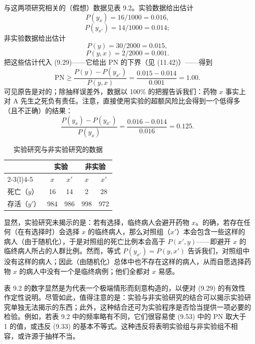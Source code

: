 与这两项研究相关的（假想）数据见表 9.2。实验数据给出估计
\begin{equation}
P(y_x)=16/1000=0.016, \tag{9.49}
\end{equation}
\begin{equation}
P(y_{x'})=14/1000=0.014; \tag{9.50}
\end{equation}
非实验数据给出估计
\begin{equation}
P(y)=30/2000=0.015, \tag{9.51}
\end{equation}
\begin{equation}
P(y,x)=2/2000=0.001. \tag{9.52}
\end{equation}
把这些估计代入 \textup{(9.29)}——它给出 PN 的下界（见 \textup{(11.42)}）——得到
\begin{equation}
\mathrm{PN}\ge\frac{P(y)-P(y_{x'})}{P(y,x)}=\frac{0.015-0.014}{0.001}=1.00. \tag{9.53}
\end{equation}
可见原告是对的；除抽样误差外，数据以 100\% 的把握告诉我们：药物 $x$ 事实上对 A 先生之死负有责任。注意，直接使用实验的超额风险比会得到一个低得多（且不正确）的结果：
\begin{equation}
\frac{P(y_x)-P(y_{x'})}{P(y_x)}=\frac{0.016-0.014}{0.016}=0.125. \tag{9.54}
\end{equation}

\begin{table}[htbp]
\centering
\caption{实验研究与非实验研究的数据}
\label{tab:9.2}
\small
\begin{tabular}{lcccc}
\toprule
& \multicolumn{2}{c}{实验} & \multicolumn{2}{c}{非实验}\\
\cmidrule(lr){2-3}\cmidrule(l){4-5}
& $x$ & $x'$ & $x$ & $x'$\\
\midrule
死亡（$y$）  & 16  & 14  & 2   & 28\\
存活（$y'$） & 984 & 986 & 998 & 972\\
\bottomrule
\end{tabular}
\end{table}

显然，实验研究未揭示的是：若有选择，临终病人会避开药物 $x$。的确，若存在任何（在有选择时）会选择 $x$ 的临终病人，那么对照组（$x'$）本会包含一些这样的病人（由于随机化），于是对照组的死亡比例本会高于 $P(x',y)$——即避开 $x$ 的临终病人所占的人群比例。然而，等式 $P(y_{x'})=P(y,x')$ 告诉我们，对照组中没有这样的病人；因此（由随机化）总体中也不存在这样的病人，从而自愿选择药物 $x$ 的病人中没有一个是临终病例；他们全都对 $x$ 易感。

表 9.2 的数字显然是为代表一个极端情形而刻意构造的，以便对 \textup{(9.29)} 的有效性作定性说明。尽管如此，值得注意的是：实验与非实验研究的结合可以揭示实验研究单独无法揭示的东西；此外，这种结合还可为实验程序是否恰当提供一项必要的检验。例如，若表 9.2 中的频率略有不同，它们很容易使 \textup{(9.53)} 中的 PN 取大于 1 的值，或违反 \textup{(9.33)} 的基本不等式。这种违反将表明实验组与非实验组不相容，或许源于抽样不当。


